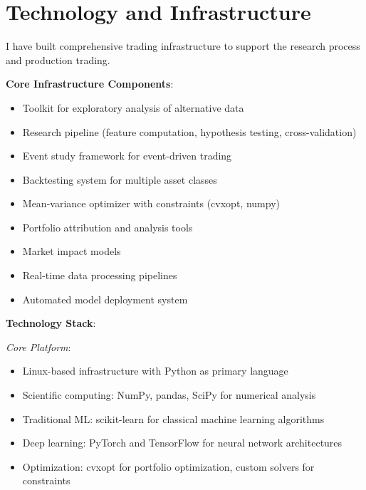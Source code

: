 \documentclass[11pt, letterpaper]{article}
\begin{document}
  \section{Technology and Infrastructure}
  \label{technology-and-infrastructure}

  I have built comprehensive trading infrastructure to support the
  research process and production trading.

  \textbf{Core Infrastructure Components}:

  \begin{itemize}
    \item Toolkit for exploratory analysis of alternative data

    \item Research pipeline (feature computation, hypothesis testing,
      cross-validation)

    \item Event study framework for event-driven trading

    \item Backtesting system for multiple asset classes

    \item Mean-variance optimizer with constraints (cvxopt, numpy)

    \item Portfolio attribution and analysis tools

    \item Market impact models

    \item Real-time data processing pipelines

    \item Automated model deployment system
  \end{itemize}

  \textbf{Technology Stack}:

  \emph{Core Platform}:

  \begin{itemize}
    \item Linux-based infrastructure with Python as primary language

    \item Scientific computing: NumPy, pandas, SciPy for numerical
      analysis

    \item Traditional ML: scikit-learn for classical machine learning
      algorithms

    \item Deep learning: PyTorch and TensorFlow for neural network
      architectures

    \item Optimization: cvxopt for portfolio optimization, custom solvers
      for constraints
  \end{itemize}
\end{document}
